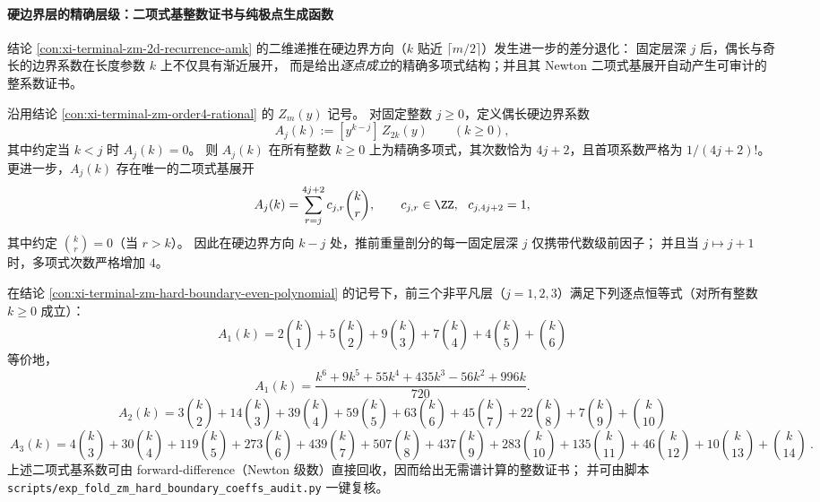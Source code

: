 

\paragraph{硬边界层的精确层级：二项式基整数证书与纯极点生成函数}
结论 \ref{con:xi-terminal-zm-2d-recurrence-amk} 的二维递推在硬边界方向（\(k\) 贴近 \(\lceil m/2\rceil\)）发生进一步的差分退化：
固定层深 \(j\) 后，偶长与奇长的边界系数在长度参数 \(k\) 上不仅具有渐近展开，
而是给出\emph{逐点成立}的精确多项式结构；并且其 Newton 二项式基展开自动产生可审计的整系数证书。

\begin{conclusion}[硬边界系数的精确多项式化：偶长 \texorpdfstring{$m=2k$}{m=2k} 的近最大重量层仅呈代数级增长]\label{con:xi-terminal-zm-hard-boundary-even-polynomial}
沿用结论 \ref{con:xi-terminal-zm-order4-rational} 的 \(Z_m(y)\) 记号。
对固定整数 \(j\ge 0\)，定义偶长硬边界系数
\[
A_j(k):=[y^{k-j}]\,Z_{2k}(y)\qquad(k\ge 0),
\]
其中约定当 \(k<j\) 时 \(A_j(k)=0\)。
则 \(A_j(k)\) 在所有整数 \(k\ge 0\) 上为精确多项式，其次数恰为 \(4j+2\)，且首项系数严格为 \(1/(4j+2)!\)。
更进一步，\(A_j(k)\) 存在唯一的二项式基展开
\[
A_j(k)=\sum_{r=j}^{4j+2}c_{j,r}\binom{k}{r},\qquad c_{j,r}\in\ZZ,\ \ c_{j,4j+2}=1,
\]
其中约定 \(\binom{k}{r}=0\)（当 \(r>k\)）。
因此在硬边界方向 \(k-j\) 处，推前重量剖分的每一固定层深 \(j\) 仅携带代数级前因子；
并且当 \(j\mapsto j+1\) 时，多项式次数严格增加 \(4\)。
\end{conclusion}

\begin{conclusion}\label{con:xi-terminal-zm-hard-boundary-even-first3}
在结论 \ref{con:xi-terminal-zm-hard-boundary-even-polynomial} 的记号下，前三个非平凡层（\(j=1,2,3\)）满足下列逐点恒等式（对所有整数 \(k\ge 0\) 成立）：
\[
\boxed{\ A_1(k)=2\binom{k}{1}+5\binom{k}{2}+9\binom{k}{3}+7\binom{k}{4}+4\binom{k}{5}+\binom{k}{6}\ }
\]
等价地，
\[
A_1(k)=\frac{k^6+9k^5+55k^4+435k^3-56k^2+996k}{720}.
\]
\[
\boxed{\ A_2(k)=3\binom{k}{2}+14\binom{k}{3}+39\binom{k}{4}+59\binom{k}{5}+63\binom{k}{6}+45\binom{k}{7}+22\binom{k}{8}+7\binom{k}{9}+\binom{k}{10}\ }
\]
\[
\boxed{\ A_3(k)=4\binom{k}{3}+30\binom{k}{4}+119\binom{k}{5}+273\binom{k}{6}+439\binom{k}{7}+507\binom{k}{8}+437\binom{k}{9}+283\binom{k}{10}+135\binom{k}{11}+46\binom{k}{12}+10\binom{k}{13}+\binom{k}{14}\ }.
\]
上述二项式基系数可由 forward-difference（Newton 级数）直接回收，因而给出无需谱计算的整数证书；
并可由脚本 \texttt{scripts/exp\_fold\_zm\_hard\_boundary\_coeffs\_audit.py} 一键复核。
\end{conclusion}

